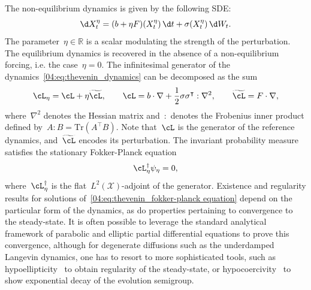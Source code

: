 The non-equilibrium dynamics is given by the following SDE:
\begin{equation}
    \label{04:eq:thevenin_dynamics}
    \d X^\eta_t = (b+\eta F)(X^\eta_t)\,\d t +\sigma(X^\eta_t)\,\d W_t.
\end{equation}
The parameter~$\eta\in\mathbb R$ is a scalar modulating the strength of the perturbation.
The equilibrium dynamics is recovered in the absence of a non-equilibrium forcing, i.e. the case~$\eta=0$.
The infinitesimal generator of the dynamics~\eqref{04:eq:thevenin_dynamics} can be decomposed as the sum
\begin{equation}
    \label{04:eq:thevenin_generator_nemd}\cL_\eta=\cL+\eta \widetilde{\cL},\qquad \cL=b \cdot \nabla + \frac12\sigma  \sigma^\intercal : \nabla ^2,\qquad \widetilde{\cL}=F\cdot \nabla,
\end{equation}
where~$\nabla^2$ denotes the Hessian matrix and~$:$ denotes the Frobenius inner product defined by~$A:B=\mathrm{Tr}(A^\intercal B)$. 
Note that~$\cL$ is the generator of the reference dynamics, and~$\widetilde{\cL}$ encodes its perturbation.
The invariant probability measure satisfies the stationary Fokker-Planck equation
\begin{equation}
    \label{04:eq:thevenin_fokker-planck equation}
    \cL_\eta^{\dagger} \psi_\eta = 0,
\end{equation}
where~$\cL_\eta^{\dagger}$ is the flat~$L^2(\mathcal X)$-adjoint of the generator. Existence and regularity results for solutions of~\eqref{04:eq:thevenin_fokker-planck equation} depend on the particular form of the dynamics, as do properties pertaining to convergence to the steady-state. It is often possible to leverage the standard analytical framework of parabolic and elliptic partial differential equations to prove this convergence, although for degenerate diffusions such as the underdamped Langevin dynamics, one has to resort to more sophisticated tools, such as hypoellipticity~\cite{H67} to obtain regularity of the steady-state, or hypocoercivity~\cite{V06} to show exponential decay of the evolution semigroup.

